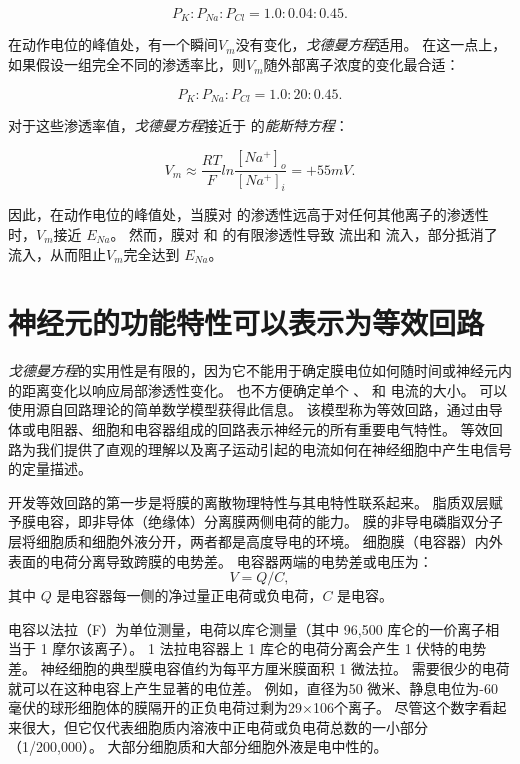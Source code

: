 \begin{equation}
	P_K : P_{Na} : P_{Cl} = 1.0 : 0.04 : 0.45.
\end{equation}


在动作电位的峰值处，有一个瞬间$V_m$没有变化，\textit{戈德曼方程}适用。 
在这一点上，如果假设一组完全不同的渗透率比，则$V_m$随外部离子浓度的变化最合适：

\begin{equation}
	P_K : P_{Na} : P_{Cl} = 1.0 : 20 : 0.45.
\end{equation}


对于这些渗透率值，\textit{戈德曼方程}接近于  的\textit{能斯特方程}：

\begin{equation}
	V_m \approx \frac{RT}{F} 
			ln \frac{[Na^+]_o}{[Na^+]_i} =
			+ 55 mV.
\end{equation}


因此，在动作电位的峰值处，当膜对  的渗透性远高于对任何其他离子的渗透性时，$V_m$接近 $E_{Na}$。 
然而，膜对  和  的有限渗透性导致  流出和  流入，部分抵消了  流入，从而阻止$V_m$完全达到 $E_{Na}$。



\section{神经元的功能特性可以表示为等效回路}

\textit{戈德曼方程}的实用性是有限的，因为它不能用于确定膜电位如何随时间或神经元内的距离变化以响应局部渗透性变化。
也不方便确定单个 、 和  电流的大小。
可以使用源自回路理论的简单数学模型获得此信息。
该模型称为等效回路，通过由导体或电阻器、细胞和电容器组成的回路表示神经元的所有重要电气特性。
等效回路为我们提供了直观的理解以及离子运动引起的电流如何在神经细胞中产生电信号的定量描述。


开发等效回路的第一步是将膜的离散物理特性与其电特性联系起来。
脂质双层赋予膜电容，即非导体（绝缘体）分离膜两侧电荷的能力。
膜的非导电磷脂双分子层将细胞质和细胞外液分开，两者都是高度导电的环境。
细胞膜（电容器）内外表面的电荷分离导致跨膜的电势差。
电容器两端的电势差或电压为：
\begin{equation}
	V = Q/C,
\end{equation}
其中 $Q$ 是电容器每一侧的净过量正电荷或负电荷，$C$ 是电容。


电容以法拉（F）为单位测量，电荷以库仑测量（其中 96,500 库仑的一价离子相当于 1 摩尔该离子）。
1 法拉电容器上 1 库仑的电荷分离会产生 1 伏特的电势差。
神经细胞的典型膜电容值约为每平方厘米膜面积 1 微法拉。 
需要很少的电荷就可以在这种电容上产生显著的电位差。 
例如，直径为50 微米、静息电位为-60 毫伏的球形细胞体的膜隔开的正负电荷过剩为29×106个离子。
尽管这个数字看起来很大，但它仅代表细胞质内溶液中正电荷或负电荷总数的一小部分（1/200,000）。
大部分细胞质和大部分细胞外液是电中性的。


